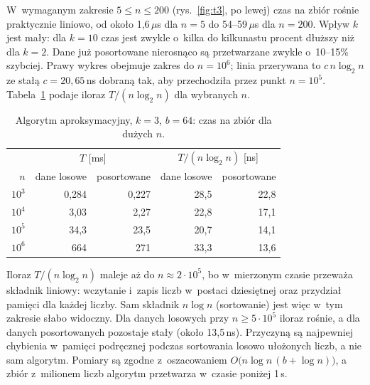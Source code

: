 \documentclass[11pt]{article}
\begin{document}
W~wymaganym zakresie \(5\leq n\leq 200\) (rys.~\ref{fig:t3}, po lewej) czas na zbiór
rośnie praktycznie liniowo, od około 1,6\,\(\mu\)s dla \(n=5\) do 54--59\,\(\mu\)s dla
\(n=200\). Wpływ \(k\) jest mały: dla \(k=10\) czas jest zwykle o~kilka do kilkunastu
procent dłuższy niż dla \(k=2\). Dane już posortowane nierosnąco są przetwarzane zwykle
o~10--15\% szybciej. Prawy wykres obejmuje zakres do
\(n=10^6\); linia przerywana to \(c\,n\log_2 n\) ze stałą \(c=20{,}65\)\,ns dobraną tak,
aby przechodziła przez punkt \(n=10^5\). Tabela~\ref{tab:t3} podaje iloraz
\(T/(n\log_2 n)\) dla wybranych \(n\).

\begin{table}[htbp]
    \centering
    \begin{tabular}{rrrrr}
        \toprule
        & \multicolumn{2}{c}{\(T\) [ms]} & \multicolumn{2}{c}{\(T/(n\log_2 n)\) [ns]} \\
        \(n\) & dane losowe & posortowane & dane losowe & posortowane \\
        \midrule
        \(10^3\) & 0,284 & 0,227 & 28,5 & 22,8 \\
        \(10^4\) & 3,03 & 2,27 & 22,8 & 17,1 \\
        \(10^5\) & 34,3 & 23,5 & 20,7 & 14,1 \\
        \(10^6\) & 664 & 271 & 33,3 & 13,6 \\
        \bottomrule
    \end{tabular}
    \caption{Algorytm aproksymacyjny, \(k=3\), \(b=64\): czas na zbiór dla dużych \(n\).}
    \label{tab:t3}
\end{table}

Iloraz \(T/(n\log_2 n)\) maleje aż do \(n\approx2\cdot10^5\), bo w~mierzonym czasie
przeważa składnik liniowy: wczytanie i~zapis liczb w~postaci dziesiętnej oraz przydział
pamięci dla każdej liczby. Sam składnik \(n\log n\) (sortowanie) jest więc w~tym zakresie
słabo widoczny. Dla danych losowych przy \(n\geq5\cdot10^5\) iloraz rośnie, a dla danych
posortowanych pozostaje stały (około 13,5\,ns). Przyczyną są najpewniej chybienia w~pamięci
podręcznej podczas sortowania losowo ułożonych liczb, a nie sam algorytm. Pomiary są
zgodne z~oszacowaniem \(O\bigl(n\log n\,(b+\log n)\bigr)\), a zbiór z~milionem liczb
algorytm przetwarza w~czasie poniżej 1\,s.
\end{document}
